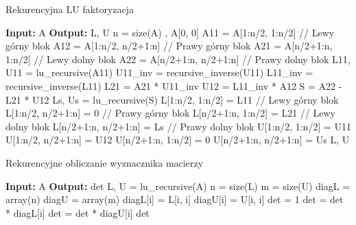 \documentclass[11pt, leqno]{scrartcl}
\begin{document}
    \begin{algorithm}[H]
        \caption{Rekurencyjna LU faktoryzacja}
        \begin{algorithmic}
            \State \textbf{Input:} A
            \State \textbf{Output:} L, U
                \State n = size(A)
                    \State {}, A[0, 0]
                \EndIf
                \State
                \State A11 = A[1:n/2, 1:n/2]      // Lewy górny blok
                \State A12 = A[1:n/2, n/2+1:n]    // Prawy górny blok
                \State A21 = A[n/2+1:n, 1:n/2]    // Lewy dolny blok
                \State A22 = A[n/2+1:n, n/2+1:n]  // Prawy dolny blok
                \State
                \State L11, U11 = lu\_recursive(A11)
                \State U11\_inv = recursive\_inverse(U11)
                \State L11\_inv = recursive\_inverse(L11)
                \State
                \State L21 = A21 * U11\_inv
                \State U12 = L11\_inv * A12
                \State S = A22 - L21 * U12
                \State Ls, Us = lu\_recursive(S)
                \State
                \State L[1:n/2, 1:n/2] = L11     // Lewy górny blok
                \State L[1:n/2, n/2+1:n] = 0     // Prawy górny blok
                \State L[n/2+1:n, 1:n/2] = L21   // Lewy dolny blok
                \State L[n/2+1:n, n/2+1:n] = Ls  // Prawy dolny blok
                \State
                \State U[1:n/2, 1:n/2] = U11
                \State U[1:n/2, n/2+1:n] = U12
                \State U[n/2+1:n, 1:n/2] = 0
                \State U[n/2+1:n, n/2+1:n] = Us
                \State \Return L, U
            \EndFunction
        \end{algorithmic}
    \end{algorithm}

    \begin{algorithm}[H]
        \caption{Rekurencyjne obliczanie wyznacznika macierzy}
        \begin{algorithmic}
            \State \textbf{Input:} A
            \State \textbf{Output:} det
                \State L, U = lu\_recursive(A)
                \State n = size(L)
                \State m = size(U)
                \State diagL = array(n)
                \State diagU = array(m)
                \State
                    \State diagL[i] = L[i, i]
                \EndFor
                    \State diagU[i] = U[i, i]
                \EndFor
                \State
                \State det = 1
                    \State det = det * diagL[i]
                \EndFor
                    \State det = det * diagU[i]
                \EndFor
                \State \Return det
            \EndFunction
        \end{algorithmic}
    \end{algorithm}
\end{document}
